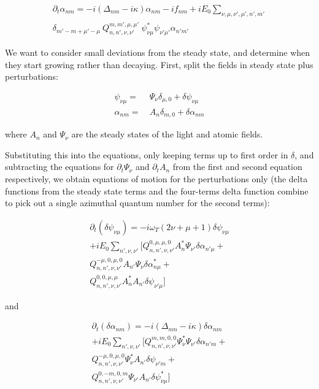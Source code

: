 \documentclass[a4paper,twocolumn,nobalancelastpage]{revtex4-1}
\newcommand{\af}{\psi_{\nu\mu}}
\newcommand{\lf}{\alpha_{nm}}
\begin{document}
\begin{multline}
\partial_t \alpha_{nm}= -i(\Delta_{nm}-i\kappa) \alpha_{nm}-if_{nm} +i E_0 \sum_{\nu, \mu,\nu', \mu',n',m'} \\ \delta_{m'-m+\mu'-\mu} \ 
Q^{m,m',\mu,\mu'}_{n,n',\nu,\nu'} \ \psi_{\nu\mu}^* \psi_{\nu'\mu'}  \alpha_{n'm'} 
\end{multline}

We want to consider small deviations from the steady state, and determine when they start growing rather than decaying.
First, split the fields in steady state plus perturbations:

\begin{align}
\af=& \ \Psi_{\nu} \delta_{\mu,0} + \delta \af \\
\lf=& \ A_{n} \delta_{m,0} + \delta \lf
\end{align}

where $A_n$ and $\Psi_{\nu}$ are the steady states of the light and atomic fields.

Substituting this into the equations, only keeping terms up to first order in $\delta$, and subtracting the equations for $\partial_t \Psi_{\nu}$ and $\partial_t A_n$ from the first and second equation respectively, we obtain equations of motion for the perturbations only (the delta functions from the steady state terms and the four-terms delta function combine to pick out a single azimuthal quantum number for the second terms):

\begin{multline}
\partial_t (\delta \af) = -i\omega_T (2\nu+\mu+1) \delta \af\\ +i E_0  \sum_{n',\nu, \nu'} \bigg[ 
Q^{0,\mu,\mu,0}_{n,n',\nu,\nu'}  A^*_n \Psi_{\nu'} \delta \alpha_{n'\mu} + \\
Q^{-\mu,0,\mu,0}_{n,n',\nu,\nu'}  A_{n'} \Psi_{\nu} \delta \alpha^*_{n\mu} + \\
Q^{0,0,\mu,\mu}_{n,n',\nu,\nu'}  A^*_{n} A_{n'} \delta \psi_{\nu' \mu} \bigg]
\end{multline}

and

\begin{multline}
\partial_t (\delta \lf) = -i(\Delta_{nm}-i\kappa) \delta \lf\\ +i E_0  \sum_{n',\nu, \nu'} \bigg[ 
Q^{m,m,0,0}_{n,n',\nu,\nu'}  \Psi^*_{\nu} \Psi_{\nu'} \delta \alpha_{n'm} + \\
Q^{-\mu,0,\mu,0}_{n,n',\nu,\nu'}  \Psi^*_{\nu} A_{n'}  \delta \psi_{\nu' m} + \\
Q^{0,-m,0,m}_{n,n',\nu,\nu'}  \Psi_{\nu'} A_{n'} \delta \psi^*_{\nu \mu} \bigg]
\end{multline}
\end{document}
